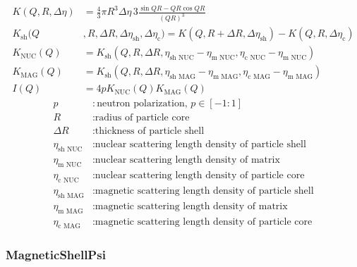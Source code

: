 \begin{align}
 K(Q,R,\Delta\eta) & = \frac{4}{3}\pi R^3 \Delta\eta \, 3 \frac{\sin QR - QR \cos
 QR}{(QR)^3} \\
   K_\text{sh}(Q&,R,\Delta R,\Delta\eta_\text{sh},\Delta\eta_\text{c}) = K(Q,R+\Delta R,\Delta\eta_\text{sh})-K(Q,R,\Delta\eta_\text{c})\\
   K_\text{NUC}(Q) &=
   K_\text{sh}(Q,R,\Delta R,\eta_{\text{sh NUC}}-\eta_{\text{m NUC}}, \eta_{\text{c NUC}}-\eta_{\text{m NUC}})\\
   K_\text{MAG}(Q) &=
   K_\text{sh}(Q,R,\Delta R,\eta_{\text{sh MAG}}-\eta_{\text{m MAG}}, \eta_{\text{c MAG}}-\eta_{\text{m MAG}})\\
   I(Q) &=4p K_\text{NUC}(Q)K_\text{MAG}(Q)
\end{align}
\begin{align}
p            &: \text{neutron polarization, } p\in[-1:1] \nonumber \\
R            &: \text{radius of particle core} \nonumber \\
\Delta R     &: \text{thickness of particle shell} \nonumber \\
\eta_{\text{sh NUC}} &: \text{nuclear scattering length density of particle shell} \nonumber \\
\eta_{\text{m NUC}}  &: \text{nuclear scattering length density of matrix} \nonumber \\
\eta_{\text{c NUC}}  &: \text{nuclear scattering length density of particle core} \nonumber \\
\eta_{\text{sh MAG}} &: \text{magnetic scattering length density of particle shell} \nonumber \\
\eta_{\text{m MAG}}  &: \text{magnetic scattering length density of matrix} \nonumber \\
\eta_{\text{c MAG}}  &: \text{magnetic scattering length density
of particle core} \nonumber
\end{align}


\clearpage
\subsubsection{MagneticShellPsi}
\label{sect:MagShellPsi}
~\\

